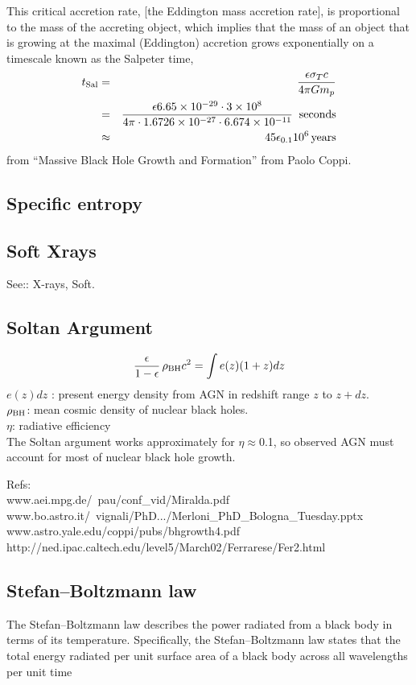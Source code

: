 \documentclass[11pt]{article}
\begin{document}
{This critical accretion rate, [the Eddington mass accretion rate], is
proportional to the mass of the accreting object, which implies that
the mass of an object that is growing at the maximal (Eddington)
accretion grows exponentially on a timescale known as the Salpeter
time,
\begin{eqnarray}
  t_{\rm Sal} & = &  \frac{\epsilon \sigma_{T} c}{4\pi G m_{p}}  \\
                 & = & \frac{\epsilon  6.65\times10^{-29} \cdot 3\times10^{8}} {4\pi \cdot 1.6726\times10^{-27} \cdot 6.674\times10^{-11}}  \;\; {\rm seconds}\\
                 & \approx & 45 \epsilon_{0.1} 10^6 \, {\rm years}
\end{eqnarray}
from ``Massive Black Hole Growth and Formation'' from Paolo Coppi. 

\subsection*{Specific entropy}


\subsection*{Soft Xrays}
See:: X-rays, Soft. 

\subsection*{Soltan Argument}
\begin{equation}
  \frac{\epsilon}{1-\epsilon} \, \rho_{\rm BH} c^{2} = \int e(z) (1+z) dz
\end{equation}
$e(z) dz$ : present energy density from AGN in redshift range $z$ to $z+dz$.\\
$\rho_{\rm BH}$: mean cosmic density of nuclear black holes.\\
$\eta$: radiative efficiency\\
The Soltan argument works approximately for $\eta\approx$0.1, 
so observed AGN must account for most of nuclear black hole growth.

Refs:\\
www.aei.mpg.de/~pau/conf\_vid/Miralda.pdf\\
www.bo.astro.it/~vignali/PhD.../Merloni\_PhD\_Bologna\_Tuesday.pptx
www.astro.yale.edu/coppi/pubs/bhgrowth4.pdf
http://ned.ipac.caltech.edu/level5/March02/Ferrarese/Fer2.html

\subsection*{Stefan–Boltzmann law}
The Stefan–Boltzmann law describes the power radiated from a black
body in terms of its temperature. Specifically, the Stefan–Boltzmann
law states that the total energy radiated per unit surface area of a
black body across all wavelengths per unit time

}
\end{document}
